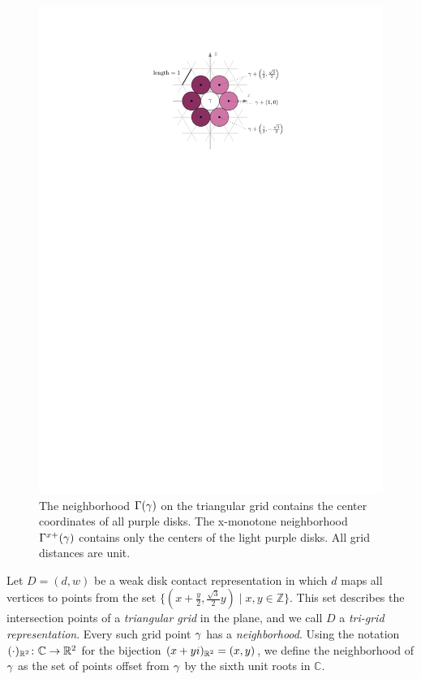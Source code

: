\begin{figure}
    \centering
    \includegraphics{graphics/ch2_neighborhood.pdf}
    \caption[Tri-grid neighborhood]{The neighborhood $\Gamma(\gamma)$ on the triangular grid contains the center coordinates of all purple disks. The x-monotone neighborhood $\Gamma^{x+}(\gamma)$ contains only the centers of the light purple disks. All grid distances are unit.}
    \label{fig:ch2-neighborhood}
\end{figure}

Let $D = (d, w)$ be a weak disk contact representation in which $d$ maps all vertices to points from the set $\{ (x + \frac y2, \frac{\sqrt3}2 y) \mid x, y \in \mathbb Z \}$. This set describes the intersection points of a \emph{triangular grid} in the plane, and we call $D$ a \emph{tri-grid representation}. Every such grid point $\gamma$ has a \emph{neighborhood}. Using the notation $(\cdot)_{\mathbb R^2}\colon \mathbb C \to \mathbb R^2$ for the bijection $(x + yi)_{\mathbb R^2} = (x, y)$, we define the neighborhood of $\gamma$ as the set of points offset from $\gamma$ by the sixth unit roots in $\mathbb C$.

